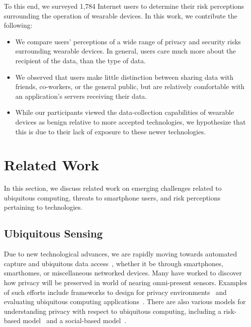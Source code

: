\documentclass{acm_proc_article-sp}
\begin{document}
To this end, we surveyed 1,784 Internet users to determine their risk perceptions surrounding the operation of wearable devices. In this work, we contribute the following: \\[-0.8cm]

\begin{itemize} \itemsep1pt \parskip0pt 
\item We compare users' perceptions of a wide range of privacy and security risks surrounding wearable devices. In general, users care much more about the recipient of the data, than the type of data.
\item We observed that users make little distinction between sharing data with friends, co-workers, or the general public, but are relatively comfortable with an application's servers receiving their data.
\item While our participants viewed the data-collection capabilities of wearable devices as benign relative to more accepted technologies, we hypothesize that this is due to their lack of exposure to these newer technologies.
\end{itemize}


\section{Related Work}
In this section, we discuss related work on emerging challenges related to ubiquitous computing, threats to smartphone users, and risk perceptions pertaining to technologies. 

\subsection{Ubiquitous Sensing}
Due to new technological advances, we are rapidly moving towards automated capture and ubiquitous data access~\cite{abowd2000charting}, whether it be through smartphones, smarthomes, or miscellaneous networked devices. Many have worked to discover how privacy will be preserved in world of nearing omni-present sensors. Examples of such efforts include frameworks to design for privacy environments~\cite{bellotti1993design} and evaluating ubiquitous computing applications~\cite{scholtz2004toward}. There are also various models for understanding privacy with respect to ubiquitous computing, including a risk-based model~\cite{hong2004privacy} and a social-based model~\cite{jiang2002approximate}. 
\end{document}
